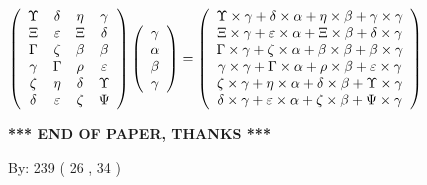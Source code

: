 \documentclass[12pt]{article}
\begin{document}
$  %
 \left( \begin{array}
 {
 c
 c
 c
 c
 }
 \Upsilon & 
 \delta & 
 \eta & 
 \gamma \\ 
                    \Xi & 
 \varepsilon & 
                    \Xi & 
 \delta \\ 
 \Gamma & 
                    \zeta & 
 \beta & 
 \beta \\ 
 \gamma & 
 \Gamma & 
 \rho & 
 \varepsilon \\ 
                    \zeta & 
 \eta & 
 \delta & 
 \Upsilon \\ 
 \delta & 
 \varepsilon & 
                    \zeta & 
 \Psi
 \end{array} \right)
 \left( \begin{array}
 {
 c
 }
 \gamma \\ 
 \alpha \\ 
 \beta \\ 
 \gamma
 \end{array} \right)
=
  \left( \begin{array}
 {
 c
 }
 \Upsilon \times  \gamma   +  \delta \times  \alpha   +  \eta \times  \beta   +  \gamma \times  \gamma \\ 
                    \Xi \times  \gamma   +  \varepsilon \times  \alpha   +                     \Xi \times  \beta   +  \delta \times  \gamma \\ 
 \Gamma \times  \gamma   +                     \zeta \times  \alpha   +  \beta \times  \beta   +  \beta \times  \gamma \\ 
 \gamma \times  \gamma   +  \Gamma \times  \alpha   +  \rho \times  \beta   +  \varepsilon \times  \gamma \\ 
                    \zeta \times  \gamma   +  \eta \times  \alpha   +  \delta \times  \beta   +  \Upsilon \times  \gamma \\ 
 \delta \times  \gamma   +  \varepsilon \times  \alpha   +                     \zeta \times  \beta   +  \Psi \times  \gamma
 \end{array} \right)
$
 
 
 
   
   
 \vspace{0.2in}
 
   
   
   
   
\vspace{1.0in} 
{\textbf{\large{ *** END OF PAPER, THANKS *** }}} 
   
   
\hspace{1.0in} By: 
 239 ( 26 ,  34 )
   
\end{document}
